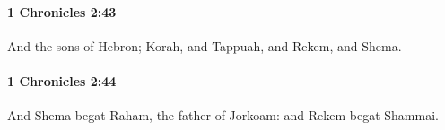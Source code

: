		\paragraph{1 Chronicles 2:43} %
			\label{1CHRONICLES-2-43}

			And the sons of Hebron; Korah, and Tappuah, and Rekem, and Shema.


		\paragraph{1 Chronicles 2:44} %
			\label{1CHRONICLES-2-44}

			And Shema begat Raham, the father of Jorkoam: and Rekem begat Shammai.


